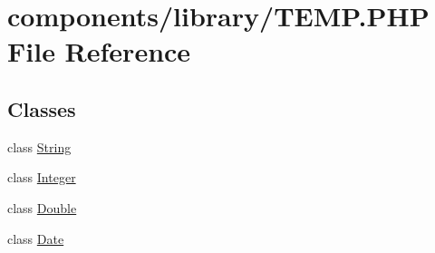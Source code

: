 \hypertarget{_t_e_m_p_8_p_h_p}{
\section{components/library/TEMP.PHP File Reference}
\label{_t_e_m_p_8_p_h_p}
}
\subsection*{Classes}
\begin{CompactItemize}
\item 
class \hyperlink{class_string}{String}
\item 
class \hyperlink{class_integer}{Integer}
\item 
class \hyperlink{class_double}{Double}
\item 
class \hyperlink{class_date}{Date}
\end{CompactItemize}
